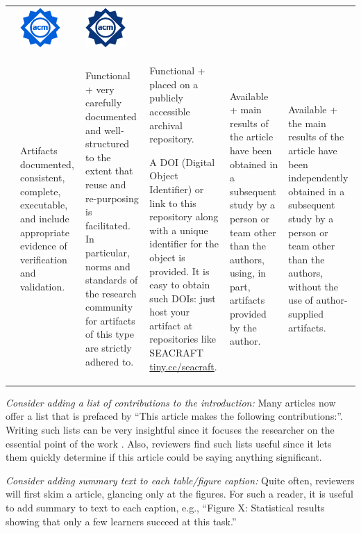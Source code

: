 \documentclass[preprint,10pt]{elsarticle}
\begin{document}
\begin{table}[!t]
\begin{tabular}{c|P{0.6in}|P{0.8in}|P{0.9in}|P{0.6in}|P{0.6in}}
& \includegraphics[width=0.6in]{fig/results_replicated_dl.jpg}  

& \includegraphics[width=0.6in]{fig/results_reproduced_dl.jpg}  \\
& Artifacts documented, consistent, complete, executable, and include appropriate evidence of verification and validation.
&
Functional + very carefully documented and well-structured to the extent that reuse and re-purposing is facilitated. In particular, norms and standards of the research community for artifacts of this type are strictly adhered to. &
Functional + placed on a publicly accessible archival repository. 

A DOI (Digital Object Identifier) or link to this repository along with a unique identifier for the object is provided. It is easy to obtain such DOIs: just host your artifact at repositories like SEACRAFT
\href{https://tiny.cc/seacraft}{tiny.cc/seacraft}. &
Available + main results of the article have been obtained in a subsequent study by a person or team other than the authors, using, in part, artifacts provided by the author.  &
Available + the main results of the article have been independently obtained in a subsequent study by a person or team other than the authors, without the use of author-supplied artifacts. \\ 
\end{tabular}
\end{table}


{\em Consider adding a list of contributions to the introduction:}  Many articles now offer a list that is prefaced by ``This article makes the following contributions:''.  Writing such lists can be very insightful since it focuses the researcher on the essential point of the work \cite{Shaw03}. Also, reviewers find such lists useful since it lets them quickly determine if this article could be saying anything significant.

{\em Consider adding summary text to each table/figure caption:} Quite often, reviewers will first skim  a article, glancing only at the figures. For such a reader, it is useful to add summary to text to each caption, e.g., ``Figure X: Statistical results showing that only a few learners succeed at this task.'' 
\end{document}
